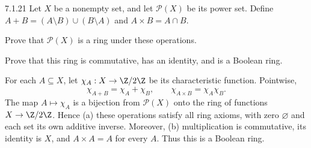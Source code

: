 \documentclass[11pt,oneside]{article}
\begin{document}
\begin{exercise}{7.1.21}
Let $X$ be a nonempty set, and let $\mathcal P(X)$ be its power set. Define $A+B=(A\setminus B)\cup(B\setminus A)$ and $A\times B=A\cap B$.
\begin{exercisesubparts}
\item Prove that $\mathcal P(X)$ is a ring under these operations.
\item Prove that this ring is commutative, has an identity, and is a Boolean ring.
\end{exercisesubparts}
\end{exercise}
\begin{solution}
For each $A\subseteq X$, let $\chi_A:X\to\Z/2\Z$ be its characteristic function. Pointwise,
\[
\chi_{A+B}=\chi_A+\chi_B,\qquad \chi_{A\times B}=\chi_A\chi_B.
\]
The map $A\mapsto\chi_A$ is a bijection from $\mathcal P(X)$ onto the ring of functions $X\to\Z/2\Z$. Hence (a) these operations satisfy all ring axioms, with zero $\varnothing$ and each set its own additive inverse. Moreover, (b) multiplication is commutative, its identity is $X$, and $A\times A=A$ for every $A$. Thus this is a Boolean ring.
\end{solution}
\end{document}
